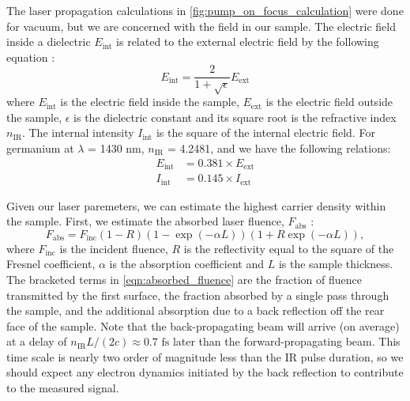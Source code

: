 The laser propagation calculations in \cref{fig:pump_on_focus_calculation} were done for vacuum, but we are concerned with the field in our sample. The electric field inside a dielectric $E_{\text{int}}$ is related to the external electric field by the following equation \cite{schultzeAttosecondBandgapDynamics2014}:
\begin{equation}
E_{\text{int}} = \frac{2}{1+\sqrt{\epsilon}} E_{\text{ext}}
\label{eqn:internal_external_Efield}
\end{equation}
where $E_{\text{int}}$ is the electric field inside the sample, $E_{\text{ext}}$ is the electric field outside the sample, $\epsilon$ is the dielectric constant and its square root is the refractive index $n_{\text{IR}}$. The internal intensity $I_{\text{int}}$ is the square of the internal electric field. For germanium at $\lambda$ = 1430 nm, $n_{\text{IR}}$ = 4.2481, and we have the following relations:
\begin{equation}
\begin{aligned}
E_{\text{int}} &= 0.381 \times E_{\text{ext}} \\
I_{\text{int}} &= 0.145 \times I_{\text{ext}}
\end{aligned}
\end{equation}

Given our laser paremeters, we can estimate the highest carrier density within the sample. First, we estimate the absorbed laser fluence, $F_{\text{abs}}$ \cite{harbCarrierRelaxationLattice2006}:
\begin{equation}
F_{\text{abs}} = F_{\text{inc}} \left(1-R\right) \left( 1-\exp(-\alpha L) \right) \left(1+R \exp(-\alpha L)\right),
\label{eqn:absorbed_fluence}
\end{equation}
where $F_{\text{inc}}$ is the incident fluence, $R$ is the reflectivity equal to the square of the Fresnel coefficient, $\alpha$ is the absorption coefficient and $L$ is the sample thickness. The bracketed terms in \cref{eqn:absorbed_fluence} are the fraction of fluence transmitted by the first surface, the fraction absorbed by a single pass through the sample, and the additional absorption due to a back reflection off the rear face of the sample. Note that the back-propagating beam will arrive (on average) at a delay of $n_{\text{IR}} L/(2c) \approx 0.7 \text{ fs}$ later than the forward-propagating beam. This time scale is nearly two order of magnitude less than the IR pulse duration, so we should expect any electron dynamics initiated by the back reflection to contribute to the measured signal.

